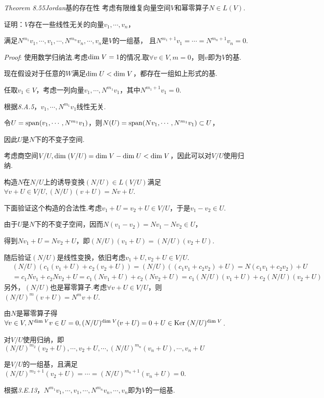 \textit{Theorem 8.55}\textit{Jordan}{\kaishu 基的存在性}
考虑有限维复向量空间$V$和幂零算子$N \in L(V)$.

证明：$V$存在一些线性无关的向量$v_1,\cdots,v_n$，

满足$N^{m_1}v_1,\cdots,v_1,\cdots,N^{m_n}v_n,\cdots,v_n$是$V$的一组基，
且$N^{m_1+1}v_1=\cdots=N^{m_n+1}v_n=0$.

\textit{Proof}:
使用数学归纳法.考虑$\mathrm{dim \;} V=1$的情况.取$\forall v \in V,m=0$，则$v$即为$V$的基.

现在假设对于任意的$W$满足$\mathrm{dim \;} U<\mathrm{dim \;} V$，都存在一组如上形式的基.

任取$v_1 \in V$，考虑一列向量$v_1,\cdots,N^{m_1}v_1$，其中$N^{m_1+1}v_1=0$.

根据\textit{8.A.5}，$v_1,\cdots,N^{m_1}v_1$线性无关.

令$U=\mathrm{span} (v_1,\cdots,N^{m_1}v_1)$，则$N(U)=\mathrm{span} (Nv_1,\cdots,N^{m_1}v_1) \subset U$，

因此$U$是$N$下的不变子空间.

考虑商空间$V/U,\mathrm{dim \;} (V/U)=\mathrm{dim \;} V-\mathrm{dim \;} U < \mathrm{dim \;} V$，因此可以对$V/U$使用归纳.

构造$N$在$N/U$上的诱导变换$(N/U) \in L(V/U)$满足$\forall v+U \in V/U,(N/U)(v+U)=Nv+U$.

下面验证这个构造的合法性.考虑$v_1+U=v_2+U \in V/U$，于是$v_1-v_2 \in U$.

由于$U$是$N$下的不变子空间，因而$N(v_1-v_2)=Nv_1-Nv_2 \in U$，

得到$Nv_1+U=Nv_2+U$，即$(N/U)(v_1+U)=(N/U)(v_2+U)$.

随后验证$(N/U)$是线性变换，依旧考虑$v_1+U,v_2+U \in V/U$.
    \begin{align*}
        &(N/U)(c_1(v_1+U)+c_2(v_2+U))=(N/U)((c_1v_1+c_2v_2)+U)=N(c_1v_1+c_2v_2)+U \\
        &=c_1Nv_1+c_2Nv_2+U=c_1(Nv_1+U)+c_2(Nv_2+U)=c_1(N/U)(v_1+U)+c_2(N/U)(v_2+U) 
    \end{align*}
另外，$(N/U)$也是幂零算子.考虑$\forall v+U \in V/U$，则$(N/U)^m(v+U)=N^m v+U$.

由$N$是幂零算子得$\forall v \in V,N^{\mathrm{dim \;} V}v \in U=0,(N/U)^{\mathrm{dim \;} V}(v+U)=0+U \in \mathrm{Ker \;} (N/U)^{\mathrm{dim \;} V}$.

对$V/U$使用归纳，即$(N/U)^{m_2}(v_2+U),\cdots,v_2+U,\cdots,(N/U)^{m_n}(v_n+U),\cdots,v_n+U$

是$V/U$的一组基，且满足$(N/U)^{m_2+1}(v_2+U)=\cdots=(N/U)^{m_n+1}(v_n+U)=0$.

根据\textit{3.E.13}，$N^{m_1}v_1,\cdots,v_1,\cdots,N^{m_n}v_n,\cdots,v_n$即为$V$的一组基.

